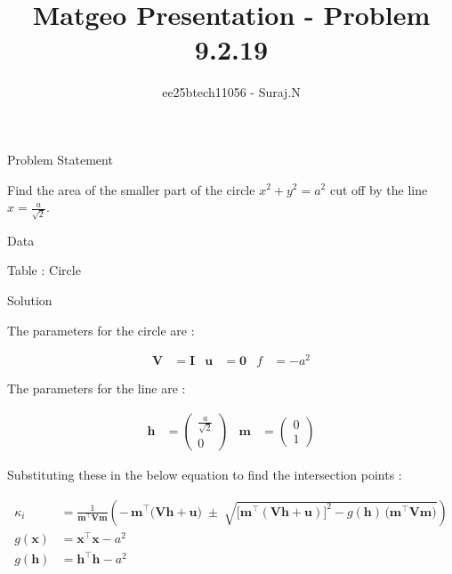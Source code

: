 \documentclass{beamer}
\title{Matgeo Presentation - Problem 9.2.19}
\author{ee25btech11056 - Suraj.N}
\numberwithin{equation}{section}
\theoremstyle{remark}
\newcommand{\myvec}[1]{\ensuremath{\begin{pmatrix}#1\end{pmatrix}}}
\let\vec\mathbf
\begin{document}
\begin{frame}
  \titlepage
\end{frame}

\begin{frame}{Problem Statement}

Find the area of the smaller part of the circle \(x^{2}+y^{2}=a^{2}\) cut off by the line \(x=\frac{a}{\sqrt{2}}.\)

\end{frame}

\begin{frame}{Data}

\begin{table}[h!]
  \centering
  
  \caption*{Table : Circle}
  \label{9.2.19}
\end{table}

\end{frame}

\begin{frame}{Solution}

The parameters for the circle are :

\begin{align}
  \vec{V} &= \vec{I} & \vec{u} &= \vec{0} & f &= -a^2 
\end{align}

The parameters for the line are :

\begin{align}
  \vec{h} &= \myvec{\tfrac{a}{\sqrt{2}}\\0} & \vec{m} &= \myvec{0\\1}
\end{align}

Substituting these in the below equation to find the intersection points :

\begin{align}
\kappa_i
  &= \frac{1}{\vec{m}^\top \vec{V}\vec{m}}
     \left(
       -\,\vec{m}^\top\big(\vec{V}\vec{h}+\vec{u}\big)
       \;\pm\;
       \sqrt{ \big[\vec{m}^\top(\vec{V}\vec{h}+\vec{u})\big]^2
       - g(\vec{h})\,\big(\vec{m}^\top \vec{V}\vec{m}\big)}
     \right)\\
    g(\vec{x}) &= \vec{x}^\top\vec{x} - a^2 \\
    g(\vec{h}) &= \vec{h}^\top\vec{h} - a^2 
\end{align}

\end{frame}
\end{document}
